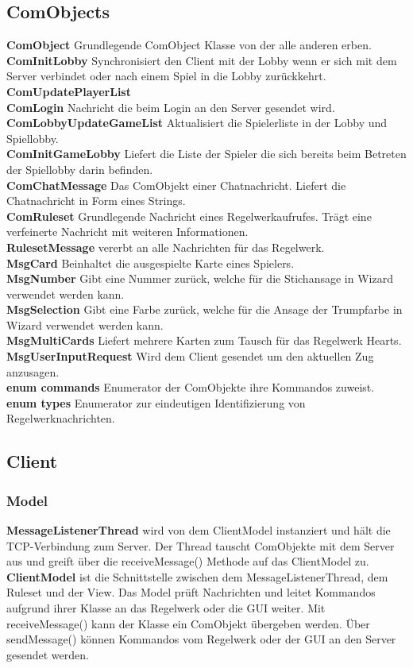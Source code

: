 \documentclass{article}
\begin{document}
	\subsection{ComObjects}
		\textbf{ComObject} Grundlegende ComObject Klasse von der alle anderen erben.\\
		\textbf{ComInitLobby} Synchronisiert den Client mit der Lobby wenn er sich mit dem Server verbindet oder nach einem Spiel in die Lobby zurückkehrt. \\
		\textbf{ComUpdatePlayerList} \\
		\textbf{ComLogin} Nachricht die beim Login an den Server gesendet wird.\\
		\textbf{ComLobbyUpdateGameList} Aktualisiert die Spielerliste in der Lobby und Spiellobby.\\
		\textbf{ComInitGameLobby} Liefert die Liste der Spieler die sich bereits beim Betreten der Spiellobby darin befinden. \\
		\textbf{ComChatMessage} Das ComObjekt einer Chatnachricht. Liefert die Chatnachricht in Form eines Strings.\\
		\textbf{ComRuleset} Grundlegende Nachricht eines Regelwerkaufrufes. Trägt eine verfeinerte Nachricht mit weiteren Informationen.\\
		\textbf{RulesetMessage} vererbt an alle Nachrichten für das Regelwerk.\\
		\textbf{MsgCard} Beinhaltet die ausgespielte Karte eines Spielers.\\
		\textbf{MsgNumber} Gibt eine Nummer zurück, welche für die Stichansage in Wizard verwendet werden kann.\\
		\textbf{MsgSelection} Gibt eine Farbe zurück, welche für die Ansage der Trumpfarbe in Wizard verwendet werden kann.\\
		\textbf{MsgMultiCards} Liefert mehrere Karten zum Tausch für das Regelwerk Hearts. \\
		\textbf{MsgUserInputRequest} Wird dem Client gesendet um den aktuellen Zug anzusagen.\\
		\textbf{enum commands}  Enumerator der ComObjekte ihre Kommandos zuweist. \\
		\textbf{enum types} Enumerator zur eindeutigen Identifizierung von Regelwerknachrichten.
	\subsection{Client}
	\subsubsection{Model}
		\textbf{MessageListenerThread} wird von dem ClientModel instanziert und hält die TCP-Verbindung zum Server. Der Thread tauscht ComObjekte mit dem Server aus und greift über die receiveMessage() Methode auf das ClientModel zu.
		\textbf{ClientModel} ist die Schnittstelle zwischen dem MessageListenerThread, dem Ruleset und der View. Das Model prüft Nachrichten und leitet Kommandos aufgrund ihrer Klasse an das Regelwerk oder die GUI weiter. Mit receiveMessage() kann der Klasse ein ComObjekt übergeben werden. Über sendMessage() können Kommandos vom Regelwerk oder der GUI an den Server gesendet werden.
		
\end{document}
